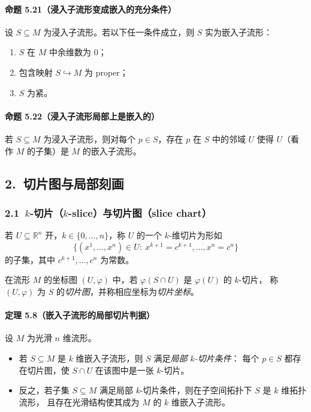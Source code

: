 \documentclass[11pt,a4paper]{article}
\begin{document}
\paragraph{命题 5.21（浸入子流形变成嵌入的充分条件）}
设 $S\subseteq M$ 为浸入子流形。若以下任一条件成立，则 $S$ 实为嵌入子流形：
\begin{enumerate}
  \item $S$ 在 $M$ 中余维数为 $0$；
  \item 包含映射 $S\hookrightarrow M$ 为 proper；
  \item $S$ 为紧。
\end{enumerate}

\paragraph{命题 5.22（浸入子流形局部上是嵌入的）}
若 $S\subseteq M$ 为浸入子流形，则对每个 $p\in S$，存在 $p$ 在 $S$ 中的邻域 $U$
使得 $U$（看作 $M$ 的子集）是 $M$ 的嵌入子流形。

\subsection*{2.\ 切片图与局部刻画}

\subsubsection*{2.1\ $k$-切片（$k$-slice）与切片图（slice chart）}
若 $U\subseteq\mathbb{R}^n$ 开，$k\in\{0,\dots,n\}$，称 $U$ 的一个 $k$-维切片为形如
\[
\{(x^1,\dots,x^n)\in U:\ x^{k+1}=c^{k+1},\dots,x^n=c^n\}
\]
的子集，其中 $c^{k+1},\dots,c^n$ 为常数。

在流形 $M$ 的坐标图 $(U,\varphi)$ 中，若 $\varphi(S\cap U)$ 是 $\varphi(U)$ 的 $k$-切片，
称 $(U,\varphi)$ 为 $S$ 的\emph{切片图}，并称相应坐标为\emph{切片坐标}。

\paragraph{定理 5.8（嵌入子流形的局部切片判据）}
设 $M$ 为光滑 $n$ 维流形。
\begin{itemize}
  \item 若 $S\subseteq M$ 是 $k$ 维嵌入子流形，则 $S$ 满足\emph{局部 $k$-切片条件}：
  每个 $p\in S$ 都存在切片图，使 $S\cap U$ 在该图中是一张 $k$-切片。
  \item 反之，若子集 $S\subseteq M$ 满足局部 $k$-切片条件，则在子空间拓扑下 $S$ 是 $k$ 维拓扑流形，
  且存在光滑结构使其成为 $M$ 的 $k$ 维嵌入子流形。
\end{itemize}
\end{document}
